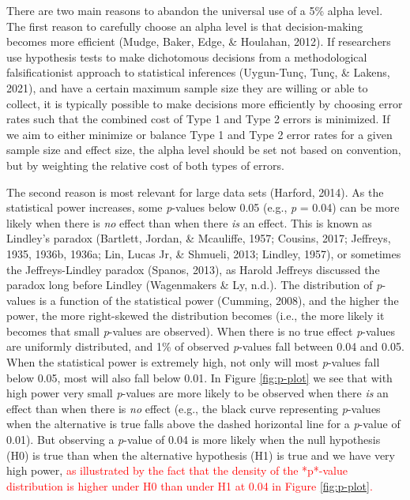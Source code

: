 \documentclass[
  english,
  ,man, a4paper,floatsintext]{apa6}
\begin{document}
There are two main reasons to abandon the universal use of a 5\% alpha level. The first reason to carefully choose an alpha level is that decision-making becomes more efficient (Mudge, Baker, Edge, \& Houlahan, 2012). If researchers use hypothesis tests to make dichotomous decisions from a methodological falsificationist approach to statistical inferences (Uygun-Tunç, Tunç, \& Lakens, 2021), and have a certain maximum sample size they are willing or able to collect, it is typically possible to make decisions more efficiently by choosing error rates such that the combined cost of Type 1 and Type 2 errors is minimized. If we aim to either minimize or balance Type 1 and Type 2 error rates for a given sample size and effect size, the alpha level should be set not based on convention, but by weighting the relative cost of both types of errors.

The second reason is most relevant for large data sets (Harford, 2014). As the statistical power increases, some \emph{p}-values below 0.05 (e.g., \emph{p} = 0.04) can be more likely when there is \emph{no} effect than when there \emph{is} an effect. This is known as Lindley's paradox (Bartlett, Jordan, \& Mcauliffe, 1957; Cousins, 2017; Jeffreys, 1935, 1936b, 1936a; Lin, Lucas Jr, \& Shmueli, 2013; Lindley, 1957), or sometimes the Jeffreys-Lindley paradox (Spanos, 2013), as Harold Jeffreys discussed the paradox long before Lindley (Wagenmakers \& Ly, n.d.). The distribution of \emph{p}-values is a function of the statistical power (Cumming, 2008), and the higher the power, the more right-skewed the distribution becomes (i.e., the more likely it becomes that small \emph{p}-values are observed). When there is no true effect \emph{p}-values are uniformly distributed, and 1\% of observed \emph{p}-values fall between 0.04 and 0.05. When the statistical power is extremely high, not only will most \emph{p}-values fall below 0.05, most will also fall below 0.01. In Figure \ref{fig:p-plot} we see that with high power very small \emph{p}-values are more likely to be observed when there \emph{is} an effect than when there is \emph{no} effect (e.g., the black curve representing \emph{p}-values when the alternative is true falls above the dashed horizontal line for a \emph{p}-value of 0.01). But observing a \emph{p}-value of 0.04 is more likely when the null hypothesis (H0) is true than when the alternative hypothesis (H1) is true and we have very high power, \textcolor{red}{as illustrated by the fact that the density of the *p*-value distribution is higher under H0 than under H1 at 0.04 in Figure \ref{fig:p-plot}.}
\end{document}
